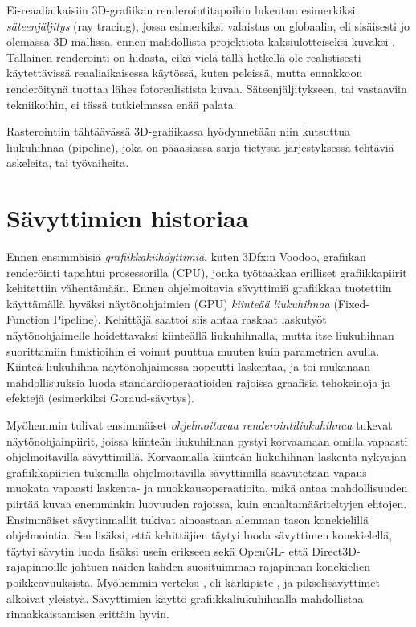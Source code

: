 \documentclass[finnish]{tktltiki2}
\theoremstyle{definition}
\theoremstyle{remark}
\begin{document}
Ei-reaaliaikaisiin 3D-grafiikan renderointitapoihin lukeutuu esimerkiksi \emph{säteenjäljitys} (ray tracing), jossa esimerkiksi valaistus on globaalia, eli sisäisesti jo olemassa 3D-mallissa, ennen mahdollista projektiota kaksiulotteiseksi kuvaksi \cite{Puh08}. Tällainen renderointi on hidasta, eikä vielä tällä hetkellä ole realistisesti käytettävissä reaaliaikaisessa käytössä, kuten peleissä, mutta ennakkoon renderöitynä tuottaa lähes fotorealistista kuvaa. Säteenjäljitykseen, tai vastaaviin tekniikoihin, ei tässä tutkielmassa enää palata.

Rasterointiin tähtäävässä 3D-grafiikassa hyödynnetään niin kutsuttua liukuhihnaa (pipeline), joka on pääasiassa sarja tietyssä järjestyksessä tehtäviä askeleita, tai työvaiheita.

\section{Sävyttimien historiaa}

Ennen ensimmäisiä \emph{grafiikkakiihdyttimiä}, kuten 3Dfx:n Voodoo, grafiikan renderöinti tapahtui prosessorilla (CPU), jonka työtaakkaa erilliset grafiikkapiirit kehitettiin vähentämään. Ennen ohjelmoitavia sävyttimiä grafiikkaa tuotettiin käyttämällä hyväksi näytönohjaimien (GPU) \emph{kiinteää liukuhihnaa} (Fixed-Function Pipeline). Kehittäjä saattoi siis antaa raskaat laskutyöt näytönohjaimelle hoidettavaksi kiinteällä liukuhihnalla, mutta itse liukuhihnan suorittamiin funktioihin ei voinut puuttua muuten kuin parametrien avulla. Kiinteä liukuhihna näytönohjaimessa nopeutti laskentaa, ja toi mukanaan mahdollisuuksia luoda standardioperaatioiden rajoissa graafisia tehokeinoja ja efektejä (esimerkiksi Goraud-sävytys).

Myöhemmin tulivat ensimmäiset \emph{ohjelmoitavaa renderointiliukuhihnaa} tukevat näytönohjainpiirit, joissa kiinteän liukuhihnan pystyi korvaamaan omilla vapaasti ohjelmoitavilla sävyttimillä. Korvaamalla kiinteän liukuhihnan laskenta nykyajan grafiikkapiirien tukemilla ohjelmoitavilla sävyttimillä saavutetaan vapaus muokata vapaasti laskenta- ja muokkausoperaatioita, mikä antaa mahdollisuuden piirtää kuvaa enemminkin luovuuden rajoissa, kuin ennaltamääriteltyjen ehtojen. Ensimmäiset sävytinmallit tukivat ainoastaan alemman tason konekielillä ohjelmointia. Sen lisäksi, että kehittäjien täytyi luoda sävyttimen konekielellä, täytyi sävytin luoda lisäksi usein erikseen sekä OpenGL- että Direct3D-rajapinnoille johtuen näiden kahden suosituimman rajapinnan konekielien poikkeavuuksista. Myöhemmin verteksi-, eli kärkipiste-, ja pikselisävyttimet alkoivat yleistyä. Sävyttimien käyttö grafiikkaliukuhihnalla mahdollistaa rinnakkaistamisen erittäin hyvin. 
\cite{Ake02}
\end{document}
